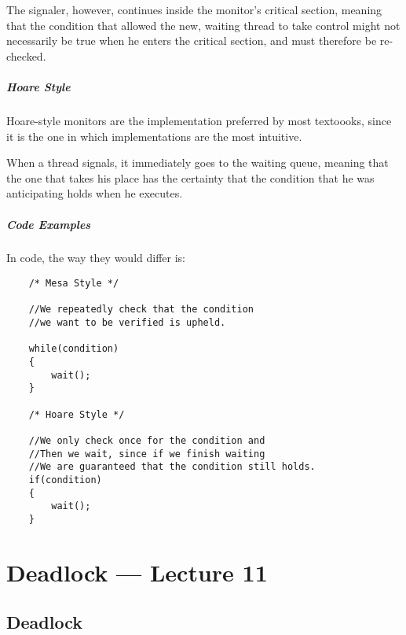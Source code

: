 \documentclass[openright, twoside]{report}
\theoremstyle{definition}
\theoremstyle{example}
\begin{document}
	The signaler, however, continues inside the monitor's critical section,
	meaning that the condition that allowed the new, waiting thread to take 
	control might not necessarily be true when he enters the critical section,
	and must therefore be re-checked.
	
	\paragraph{Hoare Style}
	Hoare-style monitors are the implementation preferred by most textoooks, 
	since it is the one in which implementations are the most intuitive.

	When a thread signals, it immediately goes to the waiting queue, meaning that 
	the one that takes his place has the certainty that the condition that 
	he was anticipating holds when he executes.

	\paragraph{Code Examples}

	In code, the way they would differ is:

	\begin{lstlisting}
	/* Mesa Style */

	//We repeatedly check that the condition
	//we want to be verified is upheld.
					 
	while(condition)
	{ 
		wait();		
	}

	/* Hoare Style */

	//We only check once for the condition and 
	//Then we wait, since if we finish waiting
	//We are guaranteed that the condition still holds.
	if(condition)	
	{				
		wait();		
	}
	\end{lstlisting}
	


\chapter{Deadlock --- Lecture 11}


	\section{Deadlock}
\end{document}
